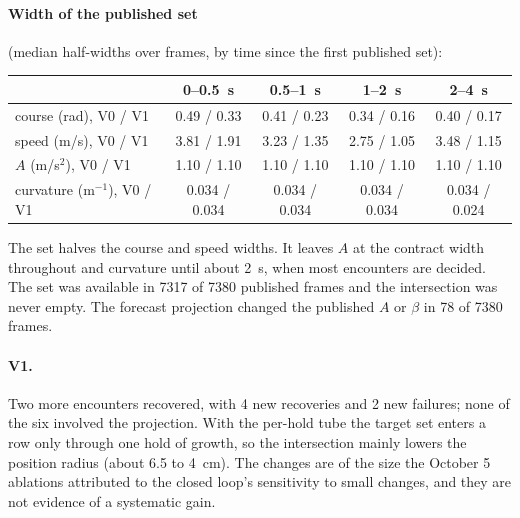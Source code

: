 \documentclass[11pt]{article}
\begin{document}
\paragraph{Width of the published set} (median half-widths over frames, by
time since the first published set):
\begin{center}
\begin{tabular}{lcccc}
\toprule
 & 0--0.5~s & 0.5--1~s & 1--2~s & 2--4~s\\
\midrule
course (rad), V0 / V1 & 0.49 / 0.33 & 0.41 / 0.23 & 0.34 / 0.16 & 0.40 / 0.17\\
speed (m/s), V0 / V1 & 3.81 / 1.91 & 3.23 / 1.35 & 2.75 / 1.05 & 3.48 / 1.15\\
$A$ (m/s$^2$), V0 / V1 & 1.10 / 1.10 & 1.10 / 1.10 & 1.10 / 1.10 & 1.10 / 1.10\\
curvature (m$^{-1}$), V0 / V1 & 0.034 / 0.034 & 0.034 / 0.034 & 0.034 / 0.034 & 0.034 / 0.024\\
\bottomrule
\end{tabular}
\end{center}
The set halves the course and speed widths. It leaves $A$ at the contract
width throughout and curvature until about 2~s, when most encounters are
decided. The set was available in 7317 of 7380 published frames and the
intersection was never empty. The forecast projection changed the published
$A$ or $\beta$ in 78 of 7380 frames.

\paragraph{V1.} Two more encounters recovered, with 4 new recoveries and 2 new
failures; none of the six involved the projection. With the per-hold tube the
target set enters a row only through one hold of growth, so the intersection
mainly lowers the position radius (about 6.5 to 4~cm). The changes are of the
size the October 5 ablations attributed to the closed loop's sensitivity to
small changes, and they are not evidence of a systematic gain.
\end{document}
